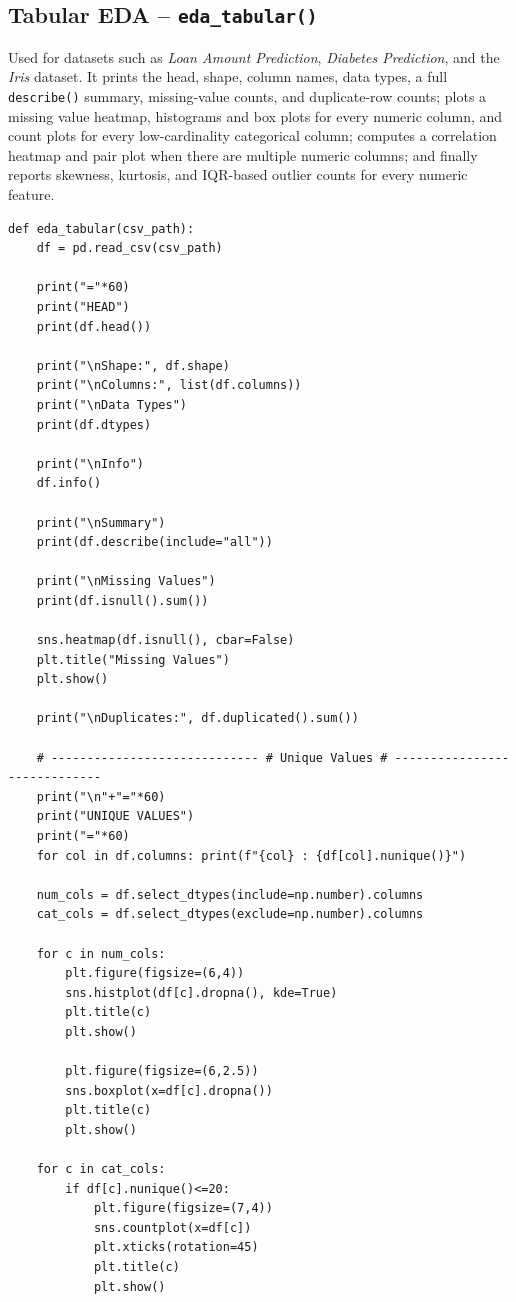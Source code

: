 \documentclass[12pt,a4paper]{article}
\begin{document}
\subsection{Tabular EDA -- \texttt{eda\_tabular()}}
Used for datasets such as \textit{Loan Amount Prediction}, \textit{Diabetes Prediction}, and
the \textit{Iris} dataset. It prints the head, shape, column names, data types, a full
\texttt{describe()} summary, missing-value counts, and duplicate-row counts; plots a missing
value heatmap, histograms and box plots for every numeric column, and count plots for every
low-cardinality categorical column; computes a correlation heatmap and pair plot when there
are multiple numeric columns; and finally reports skewness, kurtosis, and IQR-based outlier
counts for every numeric feature.
\begin{lstlisting}
def eda_tabular(csv_path):
    df = pd.read_csv(csv_path)

    print("="*60)
    print("HEAD")
    print(df.head())

    print("\nShape:", df.shape)
    print("\nColumns:", list(df.columns))
    print("\nData Types")
    print(df.dtypes)

    print("\nInfo")
    df.info()

    print("\nSummary")
    print(df.describe(include="all"))

    print("\nMissing Values")
    print(df.isnull().sum())

    sns.heatmap(df.isnull(), cbar=False)
    plt.title("Missing Values")
    plt.show()

    print("\nDuplicates:", df.duplicated().sum())

    # ----------------------------- # Unique Values # -----------------------------
    print("\n"+"="*60)
    print("UNIQUE VALUES")
    print("="*60)
    for col in df.columns: print(f"{col} : {df[col].nunique()}")

    num_cols = df.select_dtypes(include=np.number).columns
    cat_cols = df.select_dtypes(exclude=np.number).columns

    for c in num_cols:
        plt.figure(figsize=(6,4))
        sns.histplot(df[c].dropna(), kde=True)
        plt.title(c)
        plt.show()

        plt.figure(figsize=(6,2.5))
        sns.boxplot(x=df[c].dropna())
        plt.title(c)
        plt.show()

    for c in cat_cols:
        if df[c].nunique()<=20:
            plt.figure(figsize=(7,4))
            sns.countplot(x=df[c])
            plt.xticks(rotation=45)
            plt.title(c)
            plt.show()


\end{lstlisting}
\end{document}
